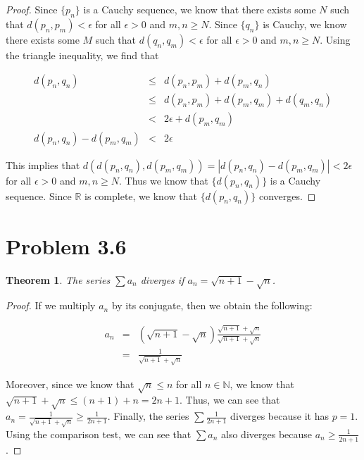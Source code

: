 \documentclass[psamsfonts]{amsart}
\newtheorem{thm}{Theorem}[section]
\theoremstyle{definition}
\theoremstyle{remark}
\numberwithin{equation}{section}
\begin{document}
\begin{proof}
Since $\{ p_n \}$ is a Cauchy sequence, we know that there exists some $N$ such that $d(p_n,p_m) < \epsilon$ for all $\epsilon > 0$ and $m,n \geq N$. Since $\{q_n \}$ is Cauchy, we know there exists some $M$ such that $d(q_n,q_m) < \epsilon$ for all $\epsilon > 0$ and $m,n \geq N$. Using the triangle inequality, we find that 

\begin{eqnarray}
d(p_n,q_n) &\leq& d(p_n, p_m) + d(p_m, q_n) \\
&\leq& d(p_n,p_m) + d(p_m, q_m) + d(q_m, q_n) \nonumber \\
&<& 2 \epsilon + d(p_m, q_m) \nonumber \\
d(p_n,q_n) - d(p_m,q_m) &<& 2 \epsilon 
\end{eqnarray}

This implies that $d( d(p_n,q_n), d(p_m,q_m) ) = |d(p_n,q_n) - d(p_m, q_m) | < 2 \epsilon$ for all $\epsilon >0$ and $m,n \geq N$. Thus we know that $\{ d(p_n,q_n) \}$ is a Cauchy sequence. Since $\mathbb{R}$ is complete, we know that $\{ d(p_n,q_n) \}$ converges.
\end{proof}


\section{Problem 3.6}

\begin{thm}
The series $\sum a_n $ diverges if $a_n = \sqrt{n+1} - \sqrt{n}$. 
\end{thm}

\begin{proof}
If we multiply $a_n$ by its conjugate, then we obtain the following:

\begin{eqnarray}
a_n &=& (\sqrt{n+1} - \sqrt{n}) \frac{\sqrt{n+1} + \sqrt{n}}{\sqrt{n+1} + \sqrt{n}} \\
&=& \frac{1}{\sqrt{n+1} + \sqrt{n}}
\end{eqnarray}

Moreover, since we know that $\sqrt{n} \leq n$ for all $n \in \mathbb{N}$, we know that $\sqrt{n+1} + \sqrt{n} \leq (n + 1) + n = 2n + 1$. Thus, we can see that $a_n = \frac{1}{\sqrt{n+1}+\sqrt{n}} \geq \frac{1}{2n+1}$. Finally, the series $\sum \frac{1}{2n+1}$ diverges because it has $p = 1$. Using the comparison test, we can see that $\sum a_n$ also diverges because $a_n \geq \frac{1}{2n+1}$. 
\end{proof}
\end{document}
